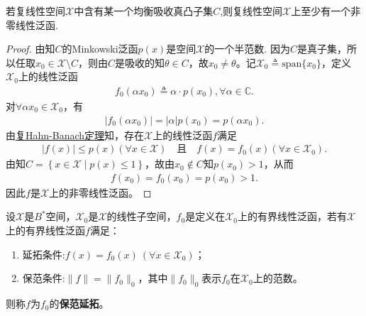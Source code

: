 \documentclass[../../main.tex]{subfiles}%
\begin{document}
\begin{theorem}
若复线性空间$\mathscr{X}$中含有某一个均衡吸收真凸子集$C$,则复线性空间$\mathscr{X}$上至少有一个非零线性泛函.
\end{theorem}
\begin{proof}

由知$C$的Minkowski泛函$p(x)$是空间$\mathscr{X}$的一个半范数.
因为$C$是真子集，所以任取$x_0\in \mathscr{X} \setminus C$，则由$C$是吸收的知$\theta \in C$，故$x_0\neq \theta$。记$\mathscr{X} _0\triangleq \mathrm{span}\{ x_0 \}$，定义$\mathscr{X} _0$上的线性泛函
\begin{align*}
f_0\left( \alpha x_0 \right) \triangleq \alpha \cdot p\left( x_0 \right) ,\forall \alpha \in \mathbb{C}.
\end{align*}
对$\forall \alpha x_0\in \mathscr{X} _0$，有
\begin{align*}
\left| f_0\left( \alpha x_0 \right) \right|=\left| \alpha \right|p\left( x_0 \right) =p\left( \alpha x_0 \right).
\end{align*}
由\hyperref[theorem:泛函分析--复Hahn-Banach定理]{复Hahn-Banach定理}知，存在$\mathscr{X}$上的线性泛函$f$满足
\begin{align*}
\left| f\left( x \right) \right|\leqslant p\left( x \right) \left( \forall x\in \mathscr{X} \right) \quad \text{且} \quad f\left( x \right) =f_0\left( x \right) \left( \forall x\in \mathscr{X} _0 \right).
\end{align*}
由知$C=\left\{ x\in \mathscr{X} \mid p\left( x \right) \leqslant 1 \right\}$，故由$x_0\notin C$知$p\left( x_0 \right) >1$，从而
\begin{align*}
f\left( x_0 \right) =f_0\left( x_0 \right) =p\left( x_0 \right) >1.
\end{align*}
因此$f$是$\mathscr{X}$上的非零线性泛函。
\end{proof}

\begin{definition}[保范延拓]
设$\mathscr{X}$是$B^*$空间，$\mathscr{X}_0$是$\mathscr{X}$的线性子空间，$f_0$是定义在$\mathscr{X}_0$上的有界线性泛函，若有$\mathscr{X}$上的有界线性泛函$f$满足：
\begin{enumerate}[(1)]
\item 延拓条件:$f(x) = f_0(x) \ (\forall x \in \mathscr{X}_0)$；
\item 保范条件:$\|f\| = \|f_0\|_0$，其中$\|f_0\|_0$表示$f_0$在$\mathscr{X}_0$上的范数。
\end{enumerate}
则称$f$为$f_0$的\textbf{保范延拓}。
\end{definition}
\end{document}
